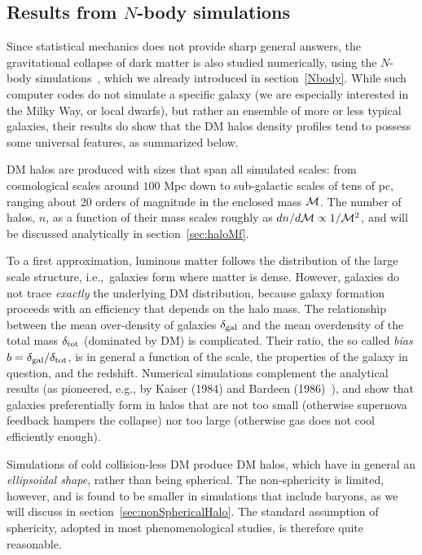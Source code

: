 \subsection{Results from $N$-body simulations}\label{sec:resNbody}

Since statistical mechanics does not provide sharp general answers, the gravitational collapse of dark matter is also studied numerically,  using the $N$-body simulations~\cite{Nbody}, which we already introduced in section~\ref{Nbody}. 
While such computer codes do not simulate a specific galaxy 
(we are especially interested in the Milky Way, or local dwarfs), but rather an ensemble of more or less typical galaxies, their results do show that the DM halos density profiles tend to possess some universal features, as summarized below.

\medskip

DM halos are produced with sizes that span all simulated scales:
from cosmological scales around $100$ Mpc down to sub-galactic scales of tens of pc,
ranging about 20 orders of magnitude in the enclosed mass ${\mathcal{M}} $.
The number of halos, $n$, as a function of their mass scales roughly  as $dn/d{\mathcal{M}}  \propto 1/{\mathcal{M}} ^2$, and
will be  discussed analytically in section~\ref{sec:haloMf}.

\smallskip

To a first approximation, luminous matter follows the distribution of the large scale structure,  i.e.,~galaxies form where matter is dense. However, galaxies do not trace {\em exactly} the underlying DM distribution, because galaxy formation proceeds with an efficiency that depends on the halo mass. The relationship between the mean over-density of galaxies $\delta_{\rm gal}$ and the mean overdensity of the total mass $\delta_{\rm tot}$ (dominated by DM) is complicated. Their ratio, the so called {\em bias} $b=\delta_{\rm gal}/\delta_{\rm tot}$, is in general a function of the scale,  the properties of the galaxy in question, and the redshift. Numerical simulations complement the analytical results (as pioneered, e.g., by Kaiser (1984) and Bardeen (1986)~\cite{bias}), 
and show that galaxies preferentially form in halos that are not too small (otherwise supernova feedback hampers the collapse) nor too large (otherwise gas does not cool efficiently enough).

\smallskip

Simulations of cold collision-less DM produce DM halos, which have in general an {\em ellipsoidal shape}, rather than being spherical. 
The non-sphericity is limited, however, and is found to be smaller in simulations that include baryons, as we will discuss in section~\ref{sec:nonSphericalHalo}. 
The standard assumption of sphericity, adopted in most phenomenological studies, is therefore quite reasonable.

